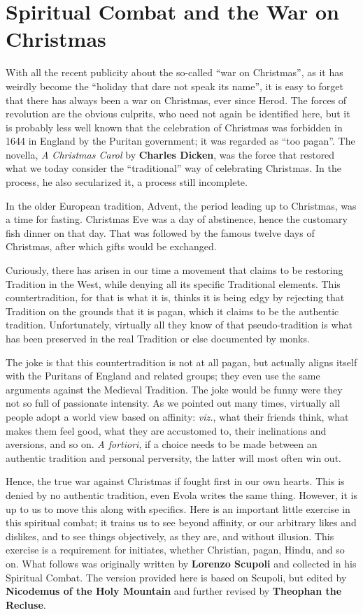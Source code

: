 \section{Spiritual Combat and the War on Christmas}

With all the recent publicity about the so-called ``war on Christmas'', as it has weirdly become the ``holiday that dare not speak its name'', it is easy to forget that there has always been a war on Christmas, ever since Herod. The forces of revolution are the obvious culprits, who need not again be identified here, but it is probably less well known that the celebration of Christmas was forbidden in 1644 in England by the Puritan government; it was regarded as ``too pagan''. The novella, \emph{A Christmas Carol} by \textbf{Charles Dicken}, was the force that restored what we today consider the ``traditional'' way of celebrating Christmas. In the process, he also secularized it, a process still incomplete.

In the older European tradition, Advent, the period leading up to Christmas, was a time for fasting. Christmas Eve was a day of abstinence, hence the customary fish dinner on that day. That was followed by the famous twelve days of Christmas, after which gifts would be exchanged.

Curiously, there has arisen in our time a movement that claims to be restoring Tradition in the West, while denying all its specific Traditional elements. This countertradition, for that is what it is, thinks it is being edgy by rejecting that Tradition on the grounds that it is pagan, which it claims to be the authentic tradition. Unfortunately, virtually all they know of that pseudo-tradition is what has been preserved in the real Tradition or else documented by monks.

The joke is that this countertradition is not at all pagan, but actually aligns itself with the Puritans of England and related groups; they even use the same arguments against the Medieval Tradition. The joke would be funny were they not so full of passionate intensity. As we pointed out many times, virtually all people adopt a world view based on affinity: \emph{viz.}, what their friends think, what makes them feel good, what they are accustomed to, their inclinations and aversions, and so on. \emph{A fortiori}, if a choice needs to be made between an authentic tradition and personal perversity, the latter will most often win out.

Hence, the true war against Christmas if fought first in our own hearts. This is denied by no authentic tradition, even Evola writes the same thing. However, it is up to us to move this along with specifics. Here is an important little exercise in this spiritual combat; it trains us to see beyond affinity, or our arbitrary likes and dislikes, and to see things objectively, as they are, and without illusion. This exercise is a requirement for initiates, whether Christian, pagan, Hindu, and so on. What follows was originally written by \textbf{Lorenzo Scupoli} and collected in his Spiritual Combat. The version provided here is based on Scupoli, but edited by \textbf{Nicodemus of the Holy Mountain} and further revised by \textbf{Theophan the Recluse}.

